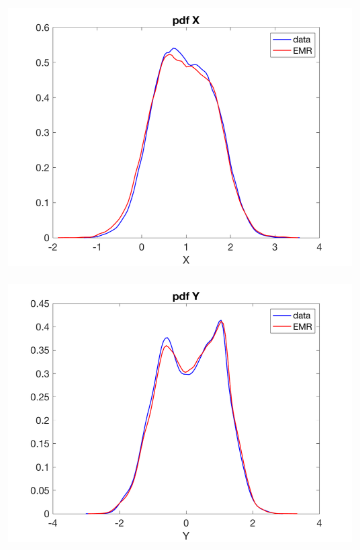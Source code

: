 \documentclass[12pt]{article}
\begin{document}
\begin{figure}[H]
	\centering
	\begin{subfigure}[b]{0.3\textwidth}
		\centering
		\includegraphics[width=\textwidth]{plots/l84l63/emrpdfxl84025.png}
	\end{subfigure}
	\hfill
	\begin{subfigure}[b]{0.3\textwidth}
		\centering
		\includegraphics[width=\textwidth]{plots/l84l63/emrpdfyl84025.png}
	\end{subfigure}
	\hfill
	\begin{subfigure}[b]{0.3\textwidth}
		\centering

\end{subfigure}
\end{figure}
\end{document}
